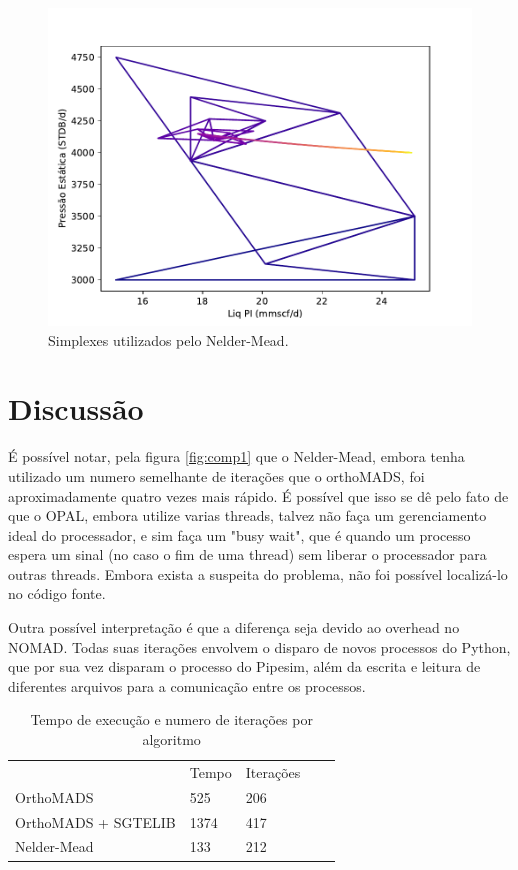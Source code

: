 \begin{figure}
\centering
	  \includegraphics[width=0.7\linewidth]{figs/triangles_neldermead.pdf}
  \caption{Simplexes utilizados pelo Nelder-Mead.}
  \label{fig:setup3_triang}
\end{figure}




\section{Discussão}

É possível notar, pela figura \ref{fig:comp1} que o Nelder-Mead, embora tenha utilizado um numero semelhante de iterações que o orthoMADS, foi aproximadamente quatro vezes mais rápido. É possível que isso se dê pelo fato de que o OPAL, embora utilize varias threads, talvez não faça um gerenciamento ideal do processador, e sim faça um "busy wait", que é quando um processo espera um sinal (no caso o fim de uma thread) sem liberar o processador para outras threads. Embora exista a suspeita do problema, não foi possível localizá-lo no código fonte.

Outra possível interpretação é que a diferença seja devido ao overhead no NOMAD. Todas suas iterações envolvem o disparo de novos processos do Python, que por sua vez disparam o processo do Pipesim, além da escrita e leitura de diferentes arquivos para a comunicação entre os processos.


\begin{table}[]
\centering
\caption{Tempo de execução e numero de iterações por algoritmo}
\label{my-label}
\begin{tabular}{lllll}
                    & Tempo & Iterações &  &  \\
OrthoMADS           & 525   & 206       &  &  \\
OrthoMADS + SGTELIB & 1374  & 417       &  &  \\
Nelder-Mead         & 133   & 212       &  & 
\end{tabular}
\end{table}


